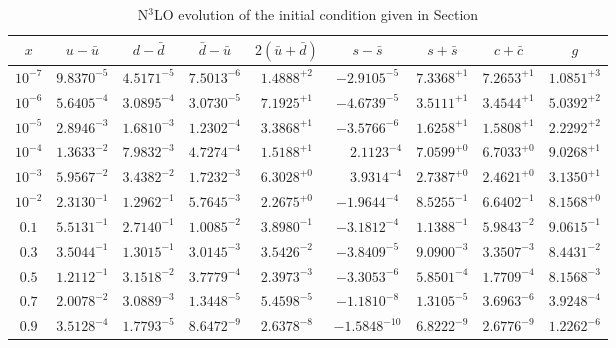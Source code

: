 \begin{table}[p]
  \small \centering
  \begin{tabular}{c|cccccccc}
    $x$ &  $u-\bar u$ &$d-\bar d$ &$\bar d-\bar u$ &  $ 2(\bar u+\bar d)$  &$s-\bar s$ &$s+\bar s$&$c+\bar c$ &   $g$\\
    \toprule
$10^{-7}$ &  $9.8370^{-5}$ &  $4.5171^{-5}$ &  $7.5013^{-6}$ &  $1.4888^{+2}$ &  $-2.9105^{-5}$ &             $7.3368^{+1}$ &  $7.2653^{+1}$ &  $1.0851^{+3}$ \\
$10^{-6}$ &  $5.6405^{-4}$ &  $3.0895^{-4}$ &  $3.0730^{-5}$ &  $7.1925^{+1}$ &  $-4.6739^{-5}$ &             $3.5111^{+1}$ &  $3.4544^{+1}$ &  $5.0392^{+2}$ \\
$10^{-5}$ &  $2.8946^{-3}$ &  $1.6810^{-3}$ &  $1.2302^{-4}$ &  $3.3868^{+1}$ &  $-3.5766^{-6}$ &             $1.6258^{+1}$ &  $1.5808^{+1}$ &  $2.2292^{+2}$ \\
$10^{-4}$ &  $1.3633^{-2}$ &  $7.9832^{-3}$ &  $4.7274^{-4}$ &  $1.5188^{+1}$ &  $\phantom{-}2.1123^{-4}$ &   $7.0599^{+0}$ &  $6.7033^{+0}$ &  $9.0268^{+1}$ \\
$10^{-3}$ &  $5.9567^{-2}$ &  $3.4382^{-2}$ &  $1.7232^{-3}$ &  $6.3028^{+0}$ &  $\phantom{-}3.9314^{-4}$ &   $2.7387^{+0}$ &  $2.4621^{+0}$ &  $3.1350^{+1}$ \\
$10^{-2}$ &  $2.3130^{-1}$ &  $1.2962^{-1}$ &  $5.7645^{-3}$ &  $2.2675^{+0}$ &  $-1.9644^{-4}$ &             $8.5255^{-1}$ &  $6.6402^{-1}$ &  $8.1568^{+0}$ \\
$0.1$    &  $5.5131^{-1}$ &  $2.7140^{-1}$ &  $1.0085^{-2}$ &  $3.8980^{-1}$ &  $-3.1812^{-4}$ &             $1.1388^{-1}$ &  $5.9843^{-2}$ &  $9.0615^{-1}$ \\
$0.3$    &  $3.5044^{-1}$ &  $1.3015^{-1}$ &  $3.0145^{-3}$ &  $3.5426^{-2}$ &  $-3.8409^{-5}$ &             $9.0900^{-3}$ &  $3.3507^{-3}$ &  $8.4431^{-2}$ \\
$0.5$    &  $1.2112^{-1}$ &  $3.1518^{-2}$ &  $3.7779^{-4}$ &  $2.3973^{-3}$ &  $-3.3053^{-6}$ &             $5.8501^{-4}$ &  $1.7709^{-4}$ &  $8.1568^{-3}$ \\
$0.7$    &  $2.0078^{-2}$ &  $3.0889^{-3}$ &  $1.3448^{-5}$ &  $5.4598^{-5}$ &  $-1.1810^{-8}$ &             $1.3105^{-5}$ &  $3.6963^{-6}$ &  $3.9248^{-4}$ \\
$0.9$    &  $3.5128^{-4}$ &  $1.7793^{-5}$ &  $8.6472^{-9}$ &  $2.6378^{-8}$ &  $-1.5848^{-10}$ &            $6.8222^{-9}$ &  $2.6776^{-9}$ &  $1.2262^{-6}$ 
  \end{tabular}
  \caption{N$^3$LO evolution of the initial condition given in Section
}
\end{table}
